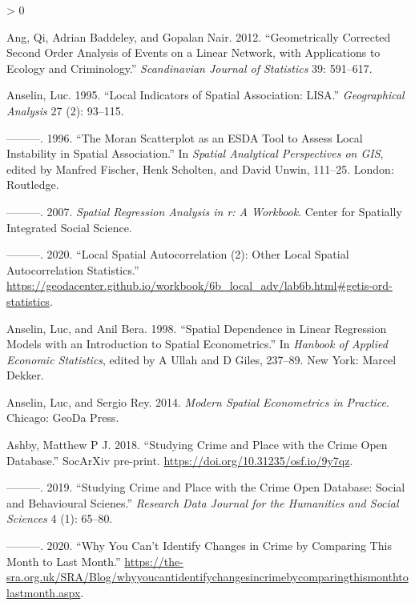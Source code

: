 \documentclass[
  krantz2]{krantz}
\newlength{\cslhangindent}
\newenvironment{CSLReferences}[2] %
 {%
  \setlength{\parindent}{0pt}
  \ifodd #1 \everypar{\setlength{\hangindent}{\cslhangindent}}\ignorespaces\fi
  \ifnum #2 > 0
  \setlength{\parskip}{#2\baselineskip}
  \fi
 }%
 {}
\begin{document}
\begin{CSLReferences}{1}{0}
\leavevmode\hypertarget{ref-Ang_2012}{}%
Ang, Qi, Adrian Baddeley, and Gopalan Nair. 2012. {``Geometrically Corrected Second Order Analysis of Events on a Linear Network, with Applications to Ecology and Criminology.''} \emph{Scandinavian Journal of Statistics} 39: 591--617.

\leavevmode\hypertarget{ref-Anselin_1995}{}%
Anselin, Luc. 1995. {``Local Indicators of Spatial Association: LISA.''} \emph{Geographical Analysis} 27 (2): 93--115.

\leavevmode\hypertarget{ref-Anselin_1996}{}%
---------. 1996. {``The Moran Scatterplot as an ESDA Tool to Assess Local Instability in Spatial Association.''} In \emph{Spatial Analytical Perspectives on GIS}, edited by Manfred Fischer, Henk Scholten, and David Unwin, 111--25. London: Routledge.

\leavevmode\hypertarget{ref-Anselin_2007}{}%
---------. 2007. \emph{Spatial Regression Analysis in r: A Workbook}. Center for Spatially Integrated Social Science.

\leavevmode\hypertarget{ref-Anselin_2020a}{}%
---------. 2020. {``Local Spatial Autocorrelation (2): Other Local Spatial Autocorrelation Statistics.''} \url{https://geodacenter.github.io/workbook/6b_local_adv/lab6b.html\#getis-ord-statistics}.

\leavevmode\hypertarget{ref-Anselin_1998}{}%
Anselin, Luc, and Anil Bera. 1998. {``Spatial Dependence in Linear Regression Models with an Introduction to Spatial Econometrics.''} In \emph{Hanbook of Applied Economic Statistics}, edited by A Ullah and D Giles, 237--89. New York: Marcel Dekker.

\leavevmode\hypertarget{ref-Anselin_2014}{}%
Anselin, Luc, and Sergio Rey. 2014. \emph{Modern Spatial Econometrics in Practice}. Chicago: GeoDa Press.

\leavevmode\hypertarget{ref-Ashby_2018}{}%
Ashby, Matthew P J. 2018. {``Studying Crime and Place with the Crime Open Database.''} SocArXiv pre-print. \url{https://doi.org/10.31235/osf.io/9y7qz}.

\leavevmode\hypertarget{ref-Ashby_2019}{}%
---------. 2019. {``Studying Crime and Place with the Crime Open Database: Social and Behavioural Scienes.''} \emph{Research Data Journal for the Humanities and Social Sciences} 4 (1): 65--80.

\leavevmode\hypertarget{ref-Ashby_2020}{}%
---------. 2020. {``Why You Can't Identify Changes in Crime by Comparing This Month to Last Month.''} \url{https://the-sra.org.uk/SRA/Blog/whyyoucantidentifychangesincrimebycomparingthismonthtolastmonth.aspx}.


\end{CSLReferences}
\end{document}
